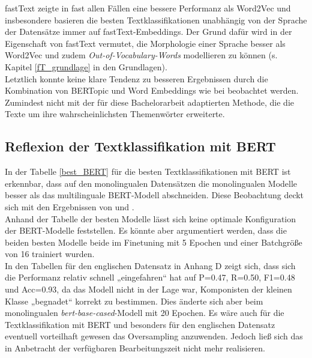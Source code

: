 \documentclass[ngerman]{ttlab-qualify}
\begin{document}
fastText zeigte in fast allen Fällen eine bessere Performanz als Word2Vec und insbesondere basieren die besten Textklassifikationen unabhängig von der Sprache der Datensätze immer auf fastText-Embeddings. Der Grund dafür wird in der Eigenschaft von fastText vermutet, die Morphologie einer Sprache besser als Word2Vec und zudem \textit{Out-of-Vocabulary-Words} modellieren zu können (s. Kapitel \ref{fT_grundlage} in den Grundlagen).
\\
Letztlich konnte keine klare Tendenz zu besseren Ergebnissen durch die Kombination von BERTopic und Word Embeddings wie bei \textcite{alhaj2022improving} beobachtet werden. Zumindest nicht mit der für diese Bachelorarbeit adaptierten Methode, die die Texte um ihre wahrscheinlichsten Themenwörter erweiterte.
\subsection{Reflexion der Textklassifikation mit BERT}
In der Tabelle \ref{best_BERT} für die besten Textklassifikationen mit BERT ist erkennbar, dass auf den monolingualen Datensätzen die monolingualen Modelle besser als das multilinguale BERT-Modell abschneiden. Diese Beobachtung deckt sich mit den Ergebnissen von  \textcite{mono_vs_multi_BERT} und \textcite{gBERT}.\\
Anhand der Tabelle der besten Modelle lässt sich keine optimale Konfiguration der BERT-Modelle feststellen. Es könnte aber argumentiert werden, dass die beiden besten Modelle beide im Finetuning mit 5 Epochen und einer Batchgröße von 16 trainiert wurden.\\
In den Tabellen für den englischen Datensatz in Anhang D zeigt sich, dass sich die Performanz relativ schnell „eingefahren“ hat auf P=0.47, R=0.50, F1=0.48 und Acc=0.93, da das Modell nicht in der Lage war, Komponisten der kleinen Klasse „begnadet“ korrekt zu bestimmen. Dies änderte sich aber beim monolingualen \textit{bert-base-cased}-Modell mit 20 Epochen. Es wäre auch für die Textklassifikation mit BERT und besonders für den englischen Datensatz eventuell vorteilhaft gewesen das Oversampling anzuwenden. Jedoch ließ sich das in Anbetracht der verfügbaren Bearbeitungszeit nicht mehr realisieren.
\end{document}
